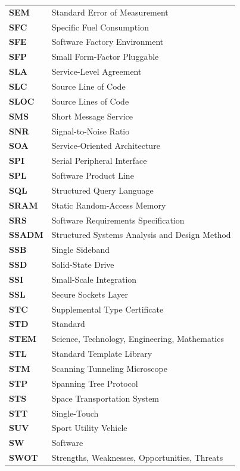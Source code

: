 \begin{longtable}{p{3cm}p{11cm}}
\textbf{SEM} & Standard Error of Measurement \\
\textbf{SFC} & Specific Fuel Consumption \\
\textbf{SFE} & Software Factory Environment \\
\textbf{SFP} & Small Form-Factor Pluggable \\
\textbf{SLA} & Service-Level Agreement \\
\textbf{SLC} & Source Line of Code \\
\textbf{SLOC} & Source Lines of Code \\
\textbf{SMS} & Short Message Service \\
\textbf{SNR} & Signal-to-Noise Ratio \\
\textbf{SOA} & Service-Oriented Architecture \\
\textbf{SPI} & Serial Peripheral Interface \\
\textbf{SPL} & Software Product Line \\
\textbf{SQL} & Structured Query Language \\
\textbf{SRAM} & Static Random-Access Memory \\
\textbf{SRS} & Software Requirements Specification \\
\textbf{SSADM} & Structured Systems Analysis and Design Method \\
\textbf{SSB} & Single Sideband \\
\textbf{SSD} & Solid-State Drive \\
\textbf{SSI} & Small-Scale Integration \\
\textbf{SSL} & Secure Sockets Layer \\
\textbf{STC} & Supplemental Type Certificate \\
\textbf{STD} & Standard \\
\textbf{STEM} & Science, Technology, Engineering, Mathematics \\
\textbf{STL} & Standard Template Library \\
\textbf{STM} & Scanning Tunneling Microscope \\
\textbf{STP} & Spanning Tree Protocol \\
\textbf{STS} & Space Transportation System \\
\textbf{STT} & Single-Touch \\
\textbf{SUV} & Sport Utility Vehicle \\
\textbf{SW} & Software \\
\textbf{SWOT} & Strengths, Weaknesses, Opportunities, Threats \\

\end{longtable}
